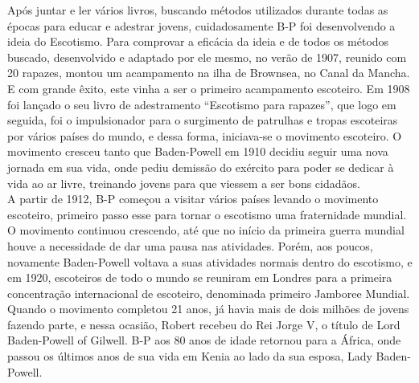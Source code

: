 \hspace*{0.5cm}Após juntar e ler vários livros, buscando métodos utilizados durante todas as épocas para educar e adestrar jovens, cuidadosamente B-P foi desenvolvendo a ideia do Escotismo.
Para comprovar a eficácia da ideia e de todos os métodos buscado, desenvolvido e adaptado por ele mesmo, no verão de 1907, reunido com 20 rapazes, montou um acampamento na ilha de Brownsea, no Canal da Mancha. E com grande êxito, este vinha a ser o primeiro acampamento escoteiro.
\hspace*{0.5cm}Em 1908 foi lançado o seu livro de adestramento “Escotismo para rapazes”, que logo em seguida, foi o impulsionador para o surgimento de patrulhas e tropas escoteiras por vários países do mundo, e dessa forma, iniciava-se o movimento escoteiro.
\hspace*{0.5cm}O movimento cresceu tanto que Baden-Powell em 1910 decidiu seguir uma nova jornada em sua vida, onde pediu demissão do exército para poder se dedicar à vida ao ar livre, treinando jovens para que viessem a ser bons cidadãos.\\
\hspace*{0.5cm}A partir de 1912, B-P começou a visitar vários países levando o movimento escoteiro, primeiro passo esse para tornar o escotismo uma fraternidade mundial. O movimento continuou crescendo, até que no início da primeira guerra mundial houve a necessidade de dar uma pausa nas atividades. Porém, aos poucos, novamente Baden-Powell voltava a suas atividades normais dentro do escotismo, e em 1920, escoteiros de todo o mundo se reuniram em Londres para a primeira concentração internacional de escoteiro, denominada primeiro Jamboree Mundial.
\hspace*{0.5cm}Quando o movimento completou 21 anos, já havia mais de dois milhões de jovens fazendo parte, e nessa ocasião, Robert recebeu do Rei Jorge V, o título de Lord Baden-Powell of Gilwell.
B-P aos 80 anos de idade retornou para a África, onde passou os últimos anos de sua vida em Kenia ao lado da sua esposa, Lady Baden-Powell.